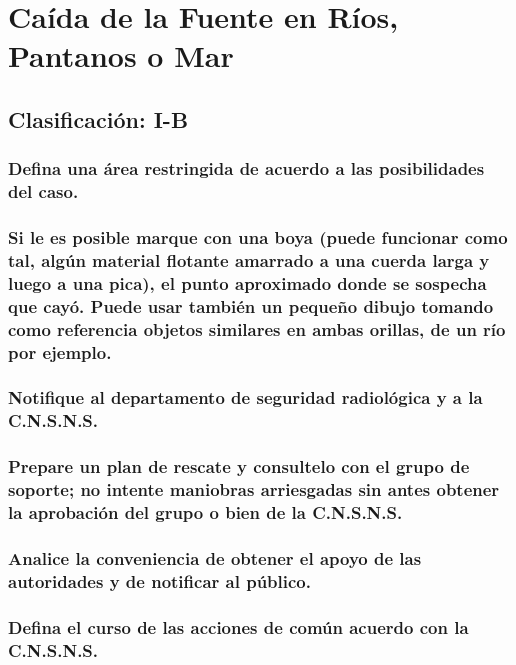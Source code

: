 \section{Caída de la Fuente en Ríos, Pantanos o Mar}

\subsection*{Clasificación: I-B}

\subsubsection{Defina una área restringida de acuerdo a las posibilidades del caso.}

\subsubsection{Si le es posible marque con una boya (puede funcionar como tal, algún material flotante amarrado a una cuerda larga y luego a una pica), el punto aproximado donde se sospecha que cayó. Puede usar también un pequeño dibujo tomando como referencia objetos similares en ambas orillas, de un río por ejemplo.}

\subsubsection{Notifique al departamento de seguridad radiológica y a la C.N.S.N.S.}

\subsubsection{Prepare un plan de rescate y consultelo con el grupo de soporte; no intente maniobras arriesgadas sin antes obtener la aprobación del grupo o bien de la C.N.S.N.S.}

\subsubsection{Analice la conveniencia de obtener el apoyo de las autoridades y de notificar al público.}

\subsubsection{Defina el curso de las acciones de común acuerdo con la C.N.S.N.S.}